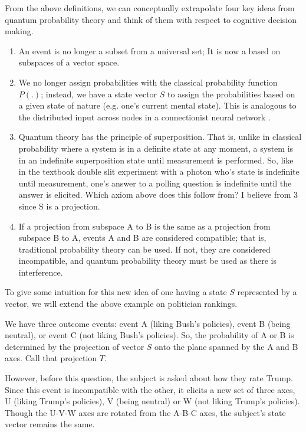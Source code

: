 \documentclass[12pt]{article}
\begin{document}
	From the above definitions, we can conceptually extrapolate four key ideas from quantum probability theory and think of them with respect to cognitive decision making. 
	\begin{enumerate}
		\item An event is no longer a subset from a universal set; It is now a based on subspaces of a vector space.
		\item We no longer assign probabilities with the classical probability function $P(.)$; instead, we have a state vector $S$ to assign the probabilities based on a given state of nature (e.g. one's current mental state). This is analogous to the distributed input across nodes in a connectionist neural network \citep{stewart_eliasmith_2013}.
		\item Quantum theory has the principle of superposition. That is, unlike in classical probability where a system is in a definite state at any moment, a system is in an indefinite superposition state until measurement is performed. So, like in the textbook double slit experiment with a photon who's state is indefinite until measurement, one's answer to a polling question is indefinite until the answer is elicited. {\sf Which axiom above does this follow from? I believe from 3 since S is a projection}.
		\item If a projection from subspace A to B is the same as a projection from subspace B to A, events A and B are considered compatible; that is, traditional probability theory can be used. If not, they are considered incompatible, and quantum probability theory must be used as there is interference. 
	\end{enumerate}

	
	
	To give some intuition for this new idea of one having a state $S$ represented by a vector, we will extend the above example on politician rankings.
	
	We have three outcome events: event A (liking Bush's policies), event B (being neutral), or event C (not liking Bush's policies). So, the probability of A or B is determined by the projection of vector $S$ onto the plane spanned by the A and B axes. Call that projection $T$. 
	
	However, before this question, the subject is asked about how they rate Trump. Since this event is incompatible with the other, it elicits a new set of three axes, U (liking Trump's policies), V (being neutral) or W (not liking Trump's policies). Though the U-V-W axes are rotated from the A-B-C axes, the subject's state vector remains the same. 
	
\end{document}
